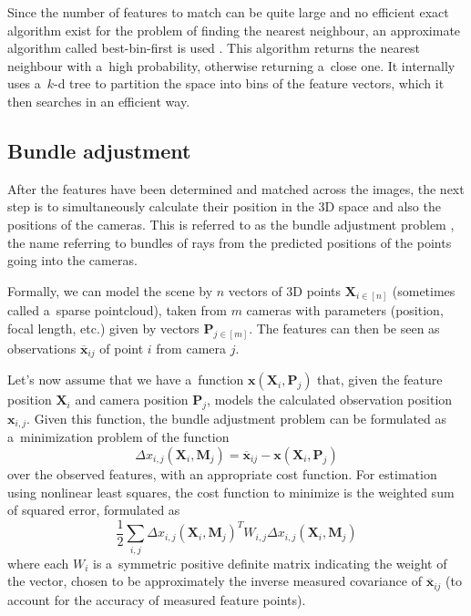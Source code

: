 Since the number of features to match can be quite large and no efficient exact algorithm exist for the problem of finding the nearest neighbour, an approximate algorithm called best-bin-first is used \cite{beis1997shape}.
This algorithm returns the nearest neighbour with a~high probability, otherwise returning a~close one.
It internally uses a~$k$-d tree to partition the space into bins of the feature vectors, which it then searches in an efficient way.

\subsection{Bundle adjustment}
After the features have been determined and matched across the images, the next step is to simultaneously calculate their position in the 3D space and also the positions of the cameras.
This is referred to as the bundle adjustment problem \cite{triggs1999bundle}, the name referring to bundles of rays from the predicted positions of the points going into the cameras.

Formally, we can model the scene by $n$ vectors of 3D points $\mathbf{X}_{i \in [n]}$ (sometimes called a~sparse pointcloud), taken from $m$ cameras with parameters (position, focal length, etc.) given by vectors $\mathbf{P}_{j \in [m]}$.
The features can then be seen as observations $\overline{\bm{x}}_{ij}$ of point $i$ from camera $j$.

Let's now assume that we have a~function $\bm{x}(\mathbf{X}_i, \mathbf{P}_j)$ that, given the feature position $\mathbf{X}_i$ and camera position $\mathbf{P}_j$, models the calculated observation position $\mathbf{x}_{i, j}$.
Given this function, the bundle adjustment problem can be formulated as a~minimization problem of the function \begin{equation} \Delta x_{i, j} (\mathbf{X}_i, \mathbf{M}_j) = \overline{\bm{x}}_{ij} - \bm{x}(\mathbf{X}_i, \mathbf{P}_j) \end{equation} over the observed features, with an appropriate cost function. For estimation using nonlinear least squares, the cost function to minimize is the weighted sum of squared error, formulated as 
\begin{equation} \frac{1}{2} \sum_{i,j} \Delta x_{i, j} (\mathbf{X}_i, \mathbf{M}_j)^T W_{i,j} \Delta x_{i, j} (\mathbf{X}_i, \mathbf{M}_j) \end{equation}
where each $W_i$ is a~symmetric positive definite matrix indicating the weight of the vector, chosen to be approximately the inverse measured covariance of $\overline{\bm{x}}_{ij}$ (to account for the accuracy of measured feature points).

